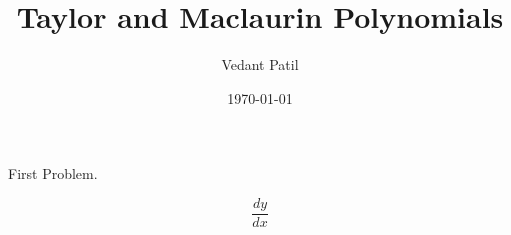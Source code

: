 \documentclass{article}
\title{Taylor and Maclaurin Polynomials}
\author{Vedant Patil}
\date{\today}
\begin{document}
\maketitle

First Problem. 

\[
  \frac{dy}{dx}
\]
\end{document}
